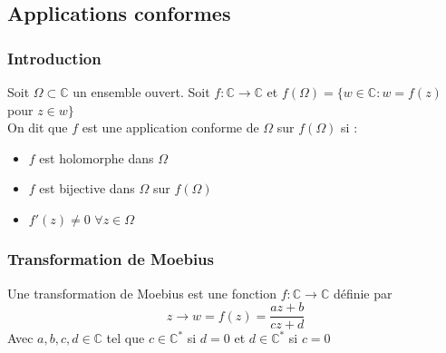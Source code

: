\documentclass[../main.tex]{subfiles}
\begin{document}
\subsection{Applications conformes}
\subsubsection{Introduction}
Soit $\Omega \subset \mathbb{C}$ un ensemble ouvert. Soit $f: \mathbb{C} \rightarrow \mathbb{C}$ et $f(\Omega) = \{w \in \mathbb{C} : w=f(z)$ pour $z\in w \}$\\

On dit que $f$ est une application conforme de $\Omega$ sur $f(\Omega)$ si : \begin{itemize}
    \item $f$ est holomorphe dans $\Omega$\\
    \item $f$ est bijective dans $\Omega$ sur $f(\Omega)$\\
    \item $f'(z)\neq 0$ $\forall z \in \Omega$\\
\end{itemize}

\subsubsection{Transformation de Moebius}
Une transformation de Moebius est une fonction $f:\mathbb{C} \rightarrow \mathbb{C}$ définie par \begin{equation}
    z\rightarrow w = f(z) = \frac{az+b}{cz+d}
\end{equation}
Avec $a,b,c,d \in \mathbb{C}$ tel que $c \in \mathbb{C}^*$ si $d=0$ et $d \in \mathbb{C}^*$ si $c=0$\\
\end{document}
